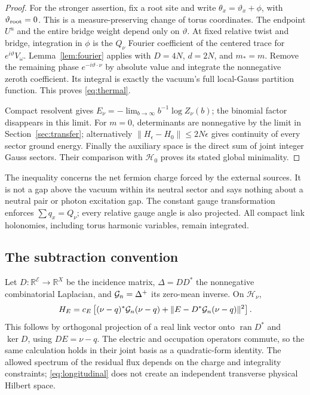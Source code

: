 \begin{proof}
For the stronger assertion, fix a root site and write
$\theta_x=\vartheta_x+\phi$, with $\vartheta_{\rm root}=0$.
This is a measure-preserving change of torus coordinates.
The endpoint $U^u$ and the entire bridge weight depend only
on $\vartheta$. At fixed relative twist and bridge, integration
in $\phi$ is the $Q_\nu$ Fourier coefficient of the centered
trace for $e^{i\vartheta}V_\omega$. Lemma~\ref{lem:fourier}
applies with $D=4N$, $d=2N$, and $m_*=m$.
Remove the remaining phase $e^{-i\vartheta\cdot\nu}$ by absolute
value and integrate the nonnegative zeroth coefficient.
Its integral is exactly the vacuum's full local-Gauss partition
function. This proves \eqref{eq:thermal}.

Compact resolvent gives
$E_\nu=-\lim_{b\to\infty}b^{-1}\log Z_\nu(b)$;
the binomial factor disappears in this limit.
For $m=0$, determinants are nonnegative by the limit in
Section~\ref{sec:transfer}; alternatively
$\|H_\epsilon-H_0\|\le2N\epsilon$ gives continuity of every
sector ground energy. Finally the auxiliary space is the direct
sum of joint integer Gauss sectors. Their comparison with
$\mathcal H_0$ proves its stated global minimality.
\end{proof}

The inequality concerns the net fermion charge forced by the
external sources. It is not a gap above the vacuum within its
neutral sector and says nothing about a neutral pair or photon
excitation gap. The constant gauge transformation enforces
$\sum q_x=Q_\nu$; every relative gauge angle is also projected.
All compact link holonomies, including torus harmonic variables,
remain integrated.

\subsection{The subtraction convention}

Let $D:\mathbb R^{\mathcal E}\to\mathbb R^X$ be the incidence
matrix, $\Delta=DD^*$ the nonnegative combinatorial Laplacian,
and $\mathcal G_n=\Delta^+$ its zero-mean inverse. On $\mathcal H_\nu$,
\begin{equation}
 H_E=c_E\left[(\nu-q)^*\mathcal G_n(\nu-q)
              +\|E-D^*\mathcal G_n(\nu-q)\|^2\right].
 \label{eq:longitudinal}
\end{equation}
This follows by orthogonal projection of a real link vector onto
$\operatorname{ran}D^*$ and $\ker D$, using $DE=\nu-q$.
The electric and occupation operators commute, so the same
calculation holds in their joint basis as a quadratic-form
identity. The allowed spectrum of the residual flux depends
on the charge and integrality constraints; \eqref{eq:longitudinal}
does not create an independent transverse physical Hilbert space.

